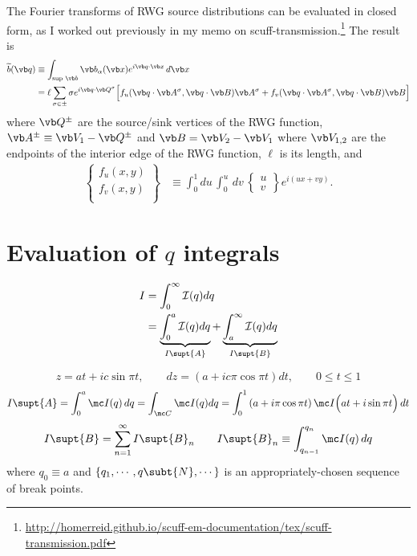 \documentclass[letterpaper]{article}
\renewcommand{\wt}{\widetilde}
\begin{document}
The Fourier transforms of RWG source distributions can be evaluated
in closed form, as I worked out previously in my memo 
on {\sc scuff-transmission}.\footnote{\url{ http://homerreid.github.io/scuff-em-documentation/tex/scuff-transmission.pdf}}
The result is
\begin{align*}
 \wt{b}(\vb q)
&\equiv \int_{\text{sup }\vb b} \vb b_\alpha(\vb x) e^{i\vb q\cdot \vb x}\,d\vb x
\\
&=\ell\sum_{\sigma\in \pm}
  \sigma e^{i\vb q \cdot \vb Q^\sigma}
   \Big[  f_u(\vb q\cdot \vb A^\sigma, \vb q\cdot \vb B) \vb A^\sigma
         +f_v(\vb q\cdot \vb A^\sigma, \vb q\cdot \vb B) \vb B
   \Big]
\end{align*}
where $\vb Q^\pm$ are the source/sink vertices of the RWG function,
$\vb A^\pm\equiv \vb V_1-\vb Q^\pm$ and $\vb B=\vb V_2-\vb V_1$ 
where $\vb V_{1,2}$ are the endpoints of the interior edge
of the RWG function, $\ell$ is its length, and
\begin{align*}
 \left\{\begin{array}{c}
 f_u(x,y) \\[3pt]
 f_v(x,y) \\
 \end{array}\right\}
&\equiv 
 \int_0^1 du \, \int_0^u \, dv \,
  \left\{\begin{array}{c} u\\[3pt] v \end{array}\right\}
  e^{i(ux + vy)}.
\end{align*}

\newpage
\section{Evaluation of $q$ integrals}

\begin{align*}
 I &= \int_0^\infty \mathcal{I}(q) dq
\\
   &= 
   \underbrace{\int_0^a      \mathcal{I}(q) dq}_{I\supt{A}}
 + \underbrace{\int_a^\infty \mathcal{I}(q) dq}_{I\supt{B}}
\end{align*}


$$ z = at + ic\sin\pi t,
   \qquad 
   dz = \left(a + ic\pi\cos\pi t\right)dt,
   \qquad 
   0\le t \le 1
$$
$$
 I\supt{A} = \int_0^a \mc I(q) \, dq
     = \int_{\mc C} \mc I(q) dq
     = \int_0^1 \left(a + i\pi\cos\pi t\right)
                \mc I\Big(at + i\sin\pi t\Big)\,dt
$$
$$
 I\supt{B} = \sum_{n=1}^\infty I\supt{B}_n
 \qquad I\supt{B}_n \equiv \int_{q_{n-1}}^{q_n} \mc I(q)\,dq
$$
where $q_0\equiv a$ and $\{q_1, \cdots, q\subt{N}, \cdots\}$
is an appropriately-chosen sequence of break points.
\end{document}
